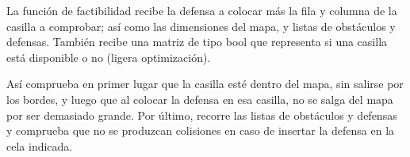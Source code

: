 La función de factibilidad recibe la defensa a colocar más la fila y columna de la casilla a comprobar; así como las dimensiones del mapa, y listas de obstáculos y defensas. También recibe una matriz de tipo bool que representa si una casilla está disponible o no (ligera optimización).

Así comprueba en primer lugar que la casilla esté dentro del mapa, sin salirse por los bordes, y luego que al colocar la defensa en esa casilla, no se salga del mapa por ser demasiado grande. Por último, recorre las listas de obstáculos y defensas y comprueba que no se produzcan colisiones en caso de insertar la defensa en la cela indicada.
